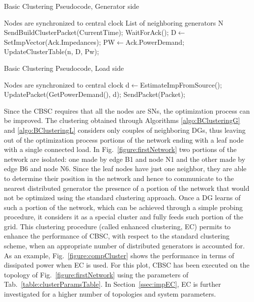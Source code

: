 \documentclass[journal]{IEEEtran}
\newcommand{\fig}[1]{Fig.~\ref{#1}}
\newcommand{\tab}[1]{Tab.~\ref{#1}}
\newcommand{\secref}[1]{Section~\ref{#1}}
\begin{document}
\begin{algorithm}
\caption{Basic Clustering Pseudocode, Generator side}\label{algo:BClusteringG}
\begin{algorithmic}[1]
\REQUIRE Nodes are synchronized to central clock
\REQUIRE List of neighboring generators N \label{line:NA}
\STATE SendBuildClusterPacket(CurrentTime); \label{line:buildCPkt}
\STATE WaitForAck();
\STATE D$\leftarrow$SetImpVector(Ack.Impedances);
\STATE PW$\leftarrow$Ack.PowerDemand;
\STATE UpdateClusterTable(n, D, Pw);
\ENDIF
\ENDFOR
\end{algorithmic}
\end{algorithm} 

\begin{algorithm}
\caption{Basic Clustering Pseudocode, Load side}\label{algo:BClusteringL}
\begin{algorithmic}[1]
\REQUIRE Nodes are synchronized to central clock
\STATE d$\leftarrow$EstimateImpFromSource();\label{line:estDist}
\STATE UpdatePacket(GetPowerDemand(), d);\label{line:upPkt}
\STATE SendPacket(Packet);\label{line:sendUpPkt}
\ENDIF
\end{algorithmic}
\end{algorithm}


Since the CBSC requires that all the nodes are SNs, the optimization process can be improved. The clustering obtained through Algorithms \ref{algo:BClusteringG} and \ref{algo:BClusteringL} considers only couples of neighboring DGs, thus leaving out of the optimization process portions of the network ending with a leaf node with a single connected load. In \fig{figure:firstNetwork} two portions of the network are isolated: one made by edge B1 and node N1 and the other made by edge B6 and node N6. Since the leaf nodes have just one neighbor, they are able to determine their position in the network and hence to communicate to the nearest distributed generator the presence of a portion of the network that would not be optimized using the standard clustering approach. Once a DG learns of such a portion of the network, which can be achieved through a simple probing procedure, it considers it as a special cluster and fully feeds such portion of the grid. This clustering procedure (called enhanced clustering, EC) permits to enhance the performance of CBSC, with respect to the standard clustering scheme, when an appropriate number of distributed generators is accounted for. As an example, \fig{figure:compCluster} shows the performance in terms of dissipated power when EC is used. For this plot, CBSC has been executed on the topology of \fig{figure:firstNetwork} using the parameters of \tab{table:clusterParamsTable}. In \secref{ssec:impEC}, EC is further investigated for a higher number of topologies and system parameters.
\end{document}
